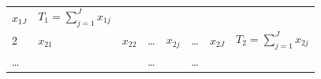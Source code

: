 \documentclass[
]{book}
\begin{document}
\begin{longtable}[]{@{}llllllll@{}}
\begin{minipage}[t]{0.03\columnwidth}
\(x_{1J}\)\strut
\end{minipage} & \begin{minipage}[t]{0.15\columnwidth}\raggedright
\(T_1=\sum_{j=1}^Jx_{1j}\)\strut
\end{minipage}\tabularnewline
\begin{minipage}[t]{0.33\columnwidth}\raggedright
2\strut
\end{minipage} & \begin{minipage}[t]{0.03\columnwidth}\raggedright
\(x_{21}\)\strut
\end{minipage} & \begin{minipage}[t]{0.03\columnwidth}\raggedright
\(x_{22}\)\strut
\end{minipage} & \begin{minipage}[t]{0.09\columnwidth}\raggedright
\ldots{}\strut
\end{minipage} & \begin{minipage}[t]{0.03\columnwidth}\raggedright
\(x_{2j}\)\strut
\end{minipage} & \begin{minipage}[t]{0.09\columnwidth}\raggedright
\ldots{}\strut
\end{minipage} & \begin{minipage}[t]{0.03\columnwidth}\raggedright
\(x_{2J}\)\strut
\end{minipage} & \begin{minipage}[t]{0.15\columnwidth}\raggedright
\(T_2=\sum_{j=1}^Jx_{2j}\)\strut
\end{minipage}\tabularnewline
\begin{minipage}[t]{0.33\columnwidth}\raggedright
\ldots{}\strut
\end{minipage} & \begin{minipage}[t]{0.03\columnwidth}\raggedright
\strut
\end{minipage} & \begin{minipage}[t]{0.03\columnwidth}\raggedright
\strut
\end{minipage} & \begin{minipage}[t]{0.09\columnwidth}\raggedright
\ldots{}\strut
\end{minipage} & \begin{minipage}[t]{0.03\columnwidth}\raggedright
\strut
\end{minipage} & \begin{minipage}[t]{0.09\columnwidth}\raggedright
\ldots{}\strut
\end{minipage} & \begin{minipage}[t]{0.03\columnwidth}\raggedright

\end{minipage}
\end{longtable}
\end{document}
